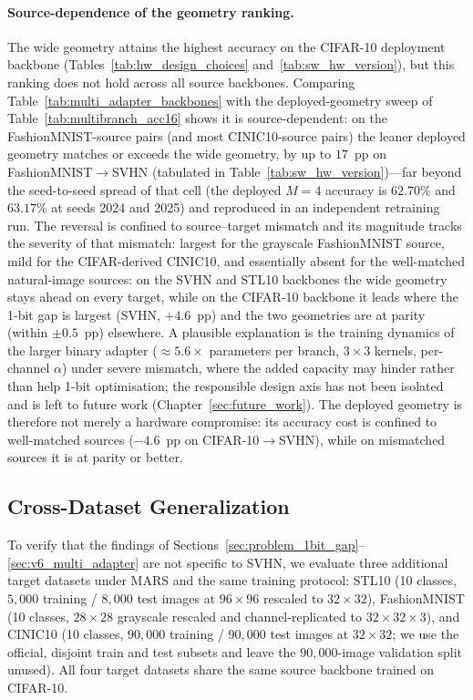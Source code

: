 \documentclass[12pt, a4paper]{report}
\numberwithin{equation}{chapter}
\numberwithin{figure}{chapter}
\numberwithin{table}{chapter}
\numberwithin{algorithm}{chapter}
\begin{document}
\paragraph{Source-dependence of the geometry ranking.} The wide geometry attains the highest accuracy on the CIFAR-10 deployment backbone (Tables~\ref{tab:hw_design_choices} and~\ref{tab:sw_hw_version}), but this ranking does not hold across all source backbones. Comparing Table~\ref{tab:multi_adapter_backbones} with the deployed-geometry sweep of Table~\ref{tab:multibranch_acc16} shows it is source-dependent: on the FashionMNIST-source pairs (and most CINIC10-source pairs) the leaner deployed geometry matches or exceeds the wide geometry, by up to $17$~pp on FashionMNIST$\to$SVHN (tabulated in Table~\ref{tab:sw_hw_version})---far beyond the seed-to-seed spread of that cell (the deployed $M{=}4$ accuracy is $62.70\%$ and $63.17\%$ at seeds 2024 and 2025) and reproduced in an independent retraining run. The reversal is confined to source--target mismatch and its magnitude tracks the severity of that mismatch: largest for the grayscale FashionMNIST source, mild for the CIFAR-derived CINIC10, and essentially absent for the well-matched natural-image sources: on the SVHN and STL10 backbones the wide geometry stays ahead on every target, while on the CIFAR-10 backbone it leads where the 1-bit gap is largest (SVHN, $+4.6$~pp) and the two geometries are at parity (within $\pm 0.5$~pp) elsewhere. A plausible explanation is the training dynamics of the larger binary adapter ($\approx 5.6\times$ parameters per branch, $3\times3$ kernels, per-channel $\alpha$) under severe mismatch, where the added capacity may hinder rather than help 1-bit optimisation; the responsible design axis has not been isolated and is left to future work (Chapter~\ref{sec:future_work}). The deployed geometry is therefore not merely a hardware compromise: its accuracy cost is confined to well-matched sources ($-4.6$~pp on CIFAR-10$\to$SVHN), while on mismatched sources it is at parity or better.

\subsection{Cross-Dataset Generalization}
\label{sec:rc_cross_dataset}

To verify that the findings of Sections~\ref{sec:problem_1bit_gap}--\ref{sec:v6_multi_adapter} are not specific to SVHN, we evaluate three additional target datasets under MARS and the same training protocol: STL10 (10 classes, $5{,}000$ training / $8{,}000$ test images at $96\times 96$ rescaled to $32\times 32$), FashionMNIST (10 classes, $28\times 28$ grayscale rescaled and channel-replicated to $32\times 32 \times 3$), and CINIC10 (10 classes, $90{,}000$ training / $90{,}000$ test images at $32\times 32$; we use the official, disjoint train and test subsets and leave the $90{,}000$-image validation split unused). All four target datasets share the same source backbone trained on CIFAR-10.
\end{document}
